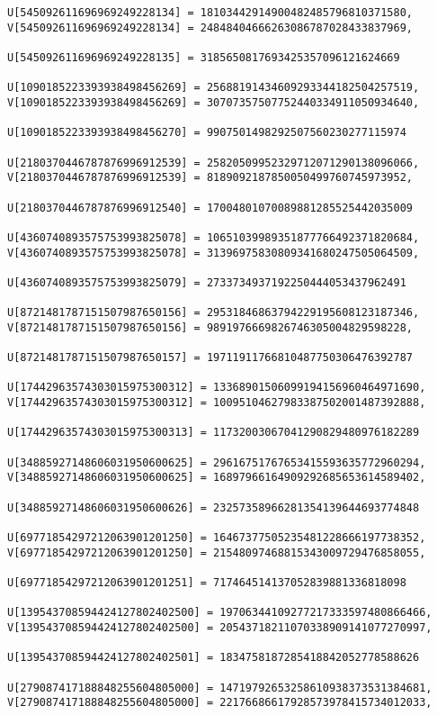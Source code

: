 \documentclass[a4paper]{article}
\begin{document}
\begin{verbatim}
U[545092611696969249228134] = 18103442914900482485796810371580, 
V[545092611696969249228134] = 24848404666263086787028433837969, 

U[545092611696969249228135] = 3185650817693425357096121624669

U[1090185223393938498456269] = 25688191434609293344182504257519, 
V[1090185223393938498456269] = 30707357507752440334911050934640, 

U[1090185223393938498456270] = 9907501498292507560230277115974

U[2180370446787876996912539] = 25820509952329712071290138096066, 
V[2180370446787876996912539] = 8189092187850050499760745973952, 

U[2180370446787876996912540] = 17004801070089881285525442035009

U[4360740893575753993825078] = 10651039989351877766492371820684, 
V[4360740893575753993825078] = 31396975830809341680247505064509, 

U[4360740893575753993825079] = 2733734937192250444053437962491

U[8721481787151507987650156] = 29531846863794229195608123187346, 
V[8721481787151507987650156] = 9891976669826746305004829598228, 

U[8721481787151507987650157] = 19711911766810487750306476392787

U[17442963574303015975300312] = 13368901506099194156960464971690, 
V[17442963574303015975300312] = 10095104627983387502001487392888, 

U[17442963574303015975300313] = 11732003067041290829480976182289

U[34885927148606031950600625] = 29616751767653415593635772960294, 
V[34885927148606031950600625] = 16897966164909292685653614589402, 

U[34885927148606031950600626] = 23257358966281354139644693774848

U[69771854297212063901201250] = 16467377505235481228666197738352, 
V[69771854297212063901201250] = 21548097468815343009729476858055, 

U[69771854297212063901201251] = 717464514137052839881336818098

U[139543708594424127802402500] = 19706344109277217333597480866466, 
V[139543708594424127802402500] = 20543718211070338909141077270997, 

U[139543708594424127802402501] = 1834758187285418842052778588626

U[279087417188848255604805000] = 14719792653258610938373531384681, 
V[279087417188848255604805000] = 22176686617928573978415734012033, 


\end{verbatim}
\end{document}
